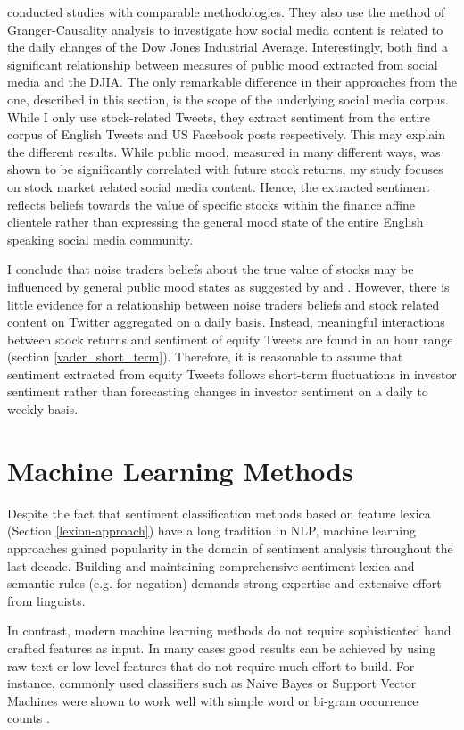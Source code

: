 \documentclass[a4paper,12pt]{article}%
\begin{document}
\citet{Bollen2011, Karabulut2013} conducted studies with comparable methodologies. They also use the method of Granger-Causality analysis to investigate how social media content is related to the daily changes of the Dow Jones Industrial Average. Interestingly, both find a significant relationship between measures of public mood extracted from social media and the DJIA. 
The only remarkable difference in their approaches from the one, described in this section, is the scope of the underlying social media corpus. While I only use stock-related Tweets, they extract sentiment from the entire corpus of English Tweets and US Facebook posts respectively. 
This may explain the different results. While public mood, measured in many different ways, was shown to be significantly correlated with future stock returns, my study focuses on stock market related social media content. Hence, the extracted sentiment reflects beliefs towards the value of specific stocks within the finance affine clientele rather than expressing the general mood state of the entire English speaking social media community.

I conclude that noise traders beliefs about the true value of stocks may be influenced by general public mood states as suggested by \citeauthor{Bollen2011} and \citeauthor{Karabulut2013}. However, there is little evidence for a relationship between noise traders beliefs and stock related content on Twitter aggregated on a daily basis. Instead, meaningful interactions between stock returns and sentiment of equity Tweets are found in an hour range (section \ref{vader_short_term}).
Therefore, it is reasonable to assume that sentiment extracted from equity Tweets follows short-term fluctuations in investor sentiment rather than forecasting changes in investor sentiment on a daily to weekly basis.

\section{Machine Learning Methods \label{ml_methos}}
Despite the fact that sentiment classification methods based on feature lexica (Section \ref{lexion-approach}) have a long tradition in NLP, machine learning approaches gained popularity in the domain of sentiment analysis throughout the last decade. Building and maintaining comprehensive sentiment lexica and semantic rules (e.g. for negation) demands strong expertise and extensive effort from linguists.

In contrast, modern machine learning methods do not require sophisticated hand crafted features as input. In many cases good results can be achieved by using raw text or low level features that do not require much effort to build. For instance, commonly used classifiers such as Naive Bayes or Support Vector Machines were shown to work well with simple word or bi-gram occurrence counts \citep{Pang2002}. 
\end{document}
